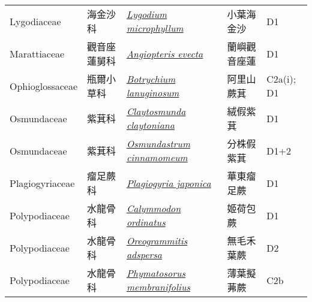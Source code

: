 {\begin{longtable}{L{2.5cm}L{2cm}L{5cm}L{2.5cm}L{3cm}}
    Lygodiaceae & 海金沙科 & \href{http://www.theplantlist.org/tpl1.1/search?q=Lygodium+microphyllum}{\textit{Lygodium microphyllum} } & 小葉海金沙 & D1    \\
    Marattiaceae & 觀音座蓮舅科 & \href{http://www.theplantlist.org/tpl1.1/search?q=Angiopteris+evecta}{\textit{Angiopteris evecta} } & 蘭嶼觀音座蓮 & D1    \\
    Ophioglossaceae & 瓶爾小草科 & \href{http://www.theplantlist.org/tpl1.1/search?q=Botrychium+lanuginosum}{\textit{Botrychium lanuginosum} } & 阿里山蕨萁 & C2a(i); D1    \\
    Osmundaceae & 紫萁科 & \href{http://www.theplantlist.org/tpl1.1/search?q=Claytosmunda+claytoniana}{\textit{Claytosmunda claytoniana} } & 絨假紫萁 & D1    \\
    Osmundaceae & 紫萁科 & \href{http://www.theplantlist.org/tpl1.1/search?q=Osmundastrum+cinnamomeum}{\textit{Osmundastrum cinnamomeum} } & 分株假紫萁 & D1+2    \\
    Plagiogyriaceae & 瘤足蕨科 & \href{http://www.theplantlist.org/tpl1.1/search?q=Plagiogyria+japonica}{\textit{Plagiogyria japonica} } & 華東瘤足蕨 & D1    \\
    Polypodiaceae & 水龍骨科 & \href{http://www.theplantlist.org/tpl1.1/search?q=Calymmodon+ordinatus}{\textit{Calymmodon ordinatus} } & 姬荷包蕨 & D1    \\
    Polypodiaceae & 水龍骨科 & \href{http://www.theplantlist.org/tpl1.1/search?q=Oreogrammitis+adspersa}{\textit{Oreogrammitis adspersa} } & 無毛禾葉蕨 & D2    \\
    Polypodiaceae & 水龍骨科 & \href{http://www.theplantlist.org/tpl1.1/search?q=Phymatosorus+membranifolius}{\textit{Phymatosorus membranifolius} } & 薄葉擬茀蕨 & C2b    \\

\end{longtable}}
